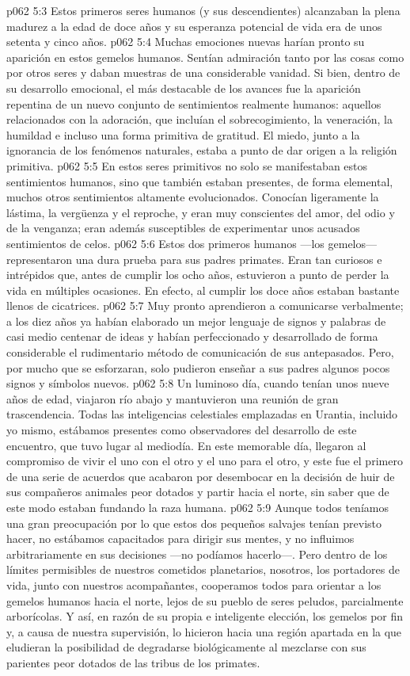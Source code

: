 \vs p062 5:3 Estos primeros seres humanos (y sus descendientes) alcanzaban la plena madurez a la edad de doce años y su esperanza potencial de vida era de unos setenta y cinco años.
\vs p062 5:4 Muchas emociones nuevas harían pronto su aparición en estos gemelos humanos. Sentían admiración tanto por las cosas como por otros seres y daban muestras de una considerable vanidad. Si bien, dentro de su desarrollo emocional, el más destacable de los avances fue la aparición repentina de un nuevo conjunto de sentimientos realmente humanos: aquellos relacionados con la adoración, que incluían el sobrecogimiento, la veneración, la humildad e incluso una forma primitiva de gratitud. El miedo, junto a la ignorancia de los fenómenos naturales, estaba a punto de dar origen a la religión primitiva.
\vs p062 5:5 En estos seres primitivos no solo se manifestaban estos sentimientos humanos, sino que también estaban presentes, de forma elemental, muchos otros sentimientos altamente evolucionados. Conocían ligeramente la lástima, la vergüenza y el reproche, y eran muy conscientes del amor, del odio y de la venganza; eran además susceptibles de experimentar unos acusados sentimientos de celos.
\vs p062 5:6 Estos dos primeros humanos ---los gemelos--- representaron una dura prueba para sus padres primates. Eran tan curiosos e intrépidos que, antes de cumplir los ocho años, estuvieron a punto de perder la vida en múltiples ocasiones. En efecto, al cumplir los doce años estaban bastante llenos de cicatrices.
\vs p062 5:7 Muy pronto aprendieron a comunicarse verbalmente; a los diez años ya habían elaborado un mejor lenguaje de signos y palabras de casi medio centenar de ideas y habían perfeccionado y desarrollado de forma considerable el rudimentario método de comunicación de sus antepasados. Pero, por mucho que se esforzaran, solo pudieron enseñar a sus padres algunos pocos signos y símbolos nuevos.
\vs p062 5:8 Un luminoso día, cuando tenían unos nueve años de edad, viajaron río abajo y mantuvieron una reunión de gran trascendencia. Todas las inteligencias celestiales emplazadas en Urantia, incluido yo mismo, estábamos presentes como observadores del desarrollo de este encuentro, que tuvo lugar al mediodía. En este memorable día, llegaron al compromiso de vivir el uno con el otro y el uno para el otro, y este fue el primero de una serie de acuerdos que acabaron por desembocar en la decisión de huir de sus compañeros animales peor dotados y partir hacia el norte, sin saber que de este modo estaban fundando la raza humana.
\vs p062 5:9 Aunque todos teníamos una gran preocupación por lo que estos dos pequeños salvajes tenían previsto hacer, no estábamos capacitados para dirigir sus mentes, y no influimos arbitrariamente en sus decisiones ---no podíamos hacerlo---. Pero dentro de los límites permisibles de nuestros cometidos planetarios, nosotros, los portadores de vida, junto con nuestros acompañantes, cooperamos todos para orientar a los gemelos humanos hacia el norte, lejos de su pueblo de seres peludos, parcialmente arborícolas. Y así, en razón de su propia e inteligente elección, los gemelos por fin  y, a causa de nuestra supervisión, lo hicieron  hacia una región apartada en la que eludieran la posibilidad de degradarse biológicamente al mezclarse con sus parientes peor dotados de las tribus de los primates.
